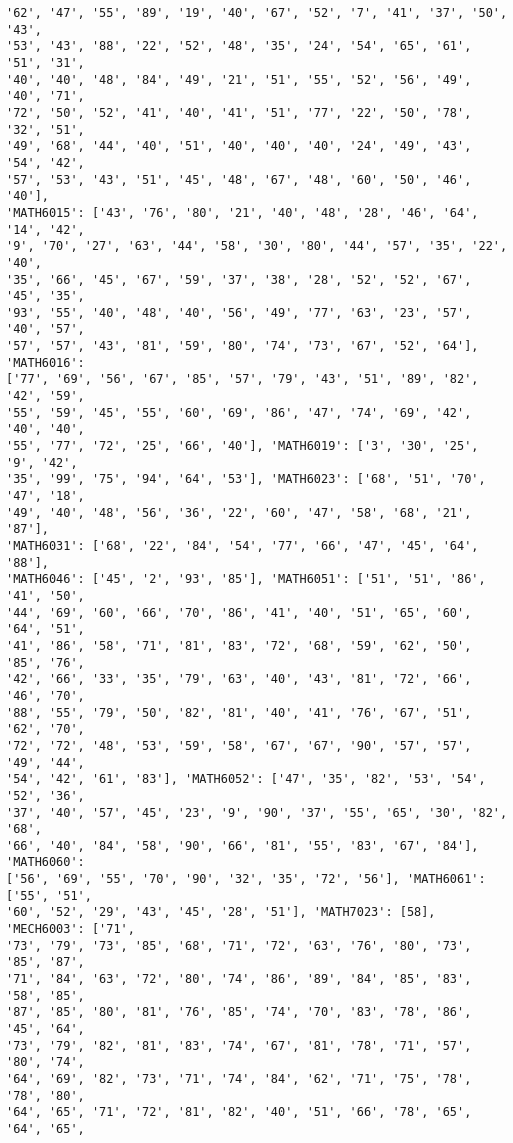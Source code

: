 \documentclass[11pt]{article}
\begin{document}
\begin{Verbatim}[commandchars=\\\{\}]
'62', '47', '55', '89', '19', '40', '67', '52', '7', '41', '37', '50', '43',
'53', '43', '88', '22', '52', '48', '35', '24', '54', '65', '61', '51', '31',
'40', '40', '48', '84', '49', '21', '51', '55', '52', '56', '49', '40', '71',
'72', '50', '52', '41', '40', '41', '51', '77', '22', '50', '78', '32', '51',
'49', '68', '44', '40', '51', '40', '40', '40', '24', '49', '43', '54', '42',
'57', '53', '43', '51', '45', '48', '67', '48', '60', '50', '46', '40'],
'MATH6015': ['43', '76', '80', '21', '40', '48', '28', '46', '64', '14', '42',
'9', '70', '27', '63', '44', '58', '30', '80', '44', '57', '35', '22', '40',
'35', '66', '45', '67', '59', '37', '38', '28', '52', '52', '67', '45', '35',
'93', '55', '40', '48', '40', '56', '49', '77', '63', '23', '57', '40', '57',
'57', '57', '43', '81', '59', '80', '74', '73', '67', '52', '64'], 'MATH6016':
['77', '69', '56', '67', '85', '57', '79', '43', '51', '89', '82', '42', '59',
'55', '59', '45', '55', '60', '69', '86', '47', '74', '69', '42', '40', '40',
'55', '77', '72', '25', '66', '40'], 'MATH6019': ['3', '30', '25', '9', '42',
'35', '99', '75', '94', '64', '53'], 'MATH6023': ['68', '51', '70', '47', '18',
'49', '40', '48', '56', '36', '22', '60', '47', '58', '68', '21', '87'],
'MATH6031': ['68', '22', '84', '54', '77', '66', '47', '45', '64', '88'],
'MATH6046': ['45', '2', '93', '85'], 'MATH6051': ['51', '51', '86', '41', '50',
'44', '69', '60', '66', '70', '86', '41', '40', '51', '65', '60', '64', '51',
'41', '86', '58', '71', '81', '83', '72', '68', '59', '62', '50', '85', '76',
'42', '66', '33', '35', '79', '63', '40', '43', '81', '72', '66', '46', '70',
'88', '55', '79', '50', '82', '81', '40', '41', '76', '67', '51', '62', '70',
'72', '72', '48', '53', '59', '58', '67', '67', '90', '57', '57', '49', '44',
'54', '42', '61', '83'], 'MATH6052': ['47', '35', '82', '53', '54', '52', '36',
'37', '40', '57', '45', '23', '9', '90', '37', '55', '65', '30', '82', '68',
'66', '40', '84', '58', '90', '66', '81', '55', '83', '67', '84'], 'MATH6060':
['56', '69', '55', '70', '90', '32', '35', '72', '56'], 'MATH6061': ['55', '51',
'60', '52', '29', '43', '45', '28', '51'], 'MATH7023': [58], 'MECH6003': ['71',
'73', '79', '73', '85', '68', '71', '72', '63', '76', '80', '73', '85', '87',
'71', '84', '63', '72', '80', '74', '86', '89', '84', '85', '83', '58', '85',
'87', '85', '80', '81', '76', '85', '74', '70', '83', '78', '86', '45', '64',
'73', '79', '82', '81', '83', '74', '67', '81', '78', '71', '57', '80', '74',
'64', '69', '82', '73', '71', '74', '84', '62', '71', '75', '78', '78', '80',
'64', '65', '71', '72', '81', '82', '40', '51', '66', '78', '65', '64', '65',

\end{Verbatim}
\end{document}
